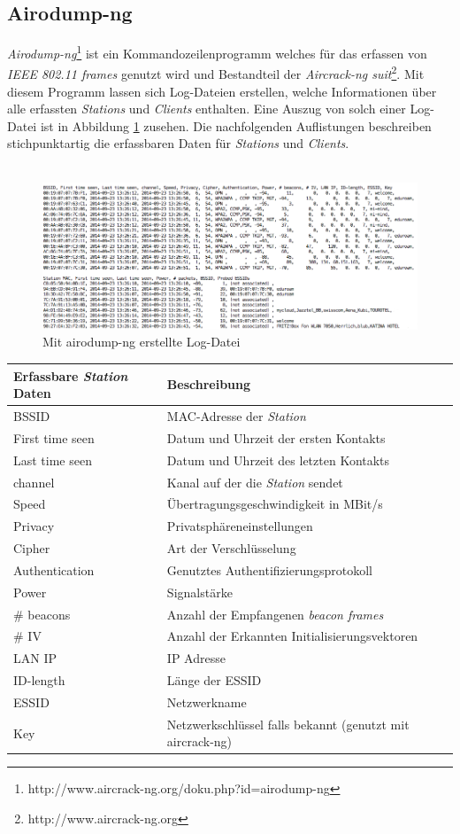 \documentclass[]{report}
\begin{document}
\subsection{Airodump-ng}\label{lab:airodump-ng}
\textit{Airodump-ng}\footnote{http://www.aircrack-ng.org/doku.php?id=airodump-ng} ist ein Kommandozeilenprogramm welches für das erfassen von \textit{IEEE 802.11 frames} genutzt wird und Bestandteil der \textit{Aircrack-ng suit}\footnote{http://www.aircrack-ng.org}. Mit diesem Programm lassen sich Log-Dateien erstellen, welche Informationen über alle erfassten \textit{Stations} und \textit{Clients} enthalten. Eine Auszug von solch einer Log-Datei ist in Abbildung \ref{fig:log_file} zusehen. Die nachfolgenden Auflistungen beschreiben stichpunktartig die erfassbaren Daten für \textit{Stations} und \textit{Clients}.\\ \\
\begin{figure}
    \centering
    \includegraphics[width=5.0in]{bilder/log.png}
    \caption{Mit airodump-ng erstellte Log-Datei}
    \label{fig:log_file}
\end{figure}
\begin{center}
  \begin{tabulary}{\textwidth}{l | L}
\toprule
Erfassbare \textit{Station} Daten & Beschreibung \\
\midrule
BSSID & MAC-Adresse der \textit{Station} \\
First time seen & Datum und Uhrzeit der ersten Kontakts \\
Last time seen & Datum und Uhrzeit des letzten Kontakts \\
channel &  Kanal auf der die \textit{Station} sendet \\
Speed & Übertragungsgeschwindigkeit in MBit/s\\
Privacy & Privatsphäreneinstellungen \\
Cipher & Art der Verschlüsselung \\
Authentication & Genutztes Authentifizierungsprotokoll \\
Power & Signalstärke \\ 
\# beacons & Anzahl der Empfangenen \textit{beacon frames}\\
\# IV & Anzahl der Erkannten Initialisierungsvektoren \\
LAN IP &  IP Adresse \\
ID-length & Länge der ESSID \\
ESSID & Netzwerkname \\
Key & Netzwerkschlüssel falls bekannt (genutzt mit aircrack-ng) \\
\bottomrule
\end{tabulary}
\end{center} 
\end{document}
